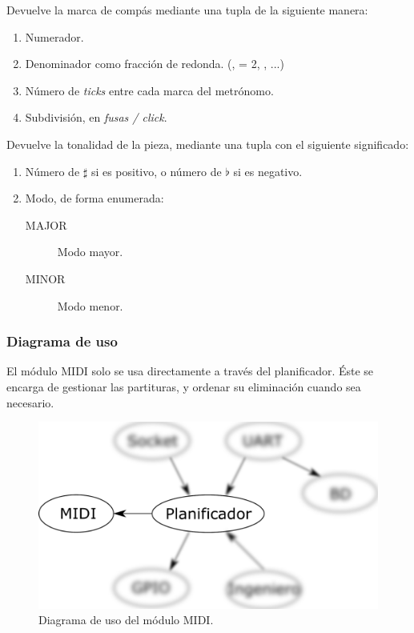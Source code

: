 \begin{description}[style=nextline]
	\item[time () : \textit{array(integer)}] 
	Devuelve la marca de compás mediante una tupla de la siguiente manera:
	
	\begin{enumerate}
		\item Numerador.
		\item Denominador como fracción de redonda. (, \halfnote = 2, ,  ...)
 		\item Número de \textit{ticks} entre cada marca del metrónomo.
 		\item Subdivisión, en \textit{fusas / click}.
	\end{enumerate}
	
	\item[key () : \textit{array(integer)}] 
	Devuelve la tonalidad de la pieza, mediante una tupla con el siguiente significado:
	
	\begin{enumerate}
		\item Número de $\sharp$ si es positivo, o número de $\flat$ si es negativo.
		\item Modo, de forma enumerada:
		
		\begin{description}
			\item[MAJOR] Modo mayor.
			\item[MINOR] Modo menor.
		\end{description}
	\end{enumerate}
\end{description}

\subsubsection{Diagrama de uso}

El módulo \acrshort{MIDI} solo se usa directamente a través del planificador. Éste se encarga de gestionar las partituras, y ordenar su eliminación cuando sea necesario.

\smallskip

\begin{figure}[H]
	\noindent \begin{centering}
		\includegraphics[width=\linewidth/2]{capitulo4/daemon_midi}
		\par\end{centering}
	\smallskip
	\caption{\label{fig:daemon_midi} Diagrama de uso del módulo MIDI.}
\end{figure} 

